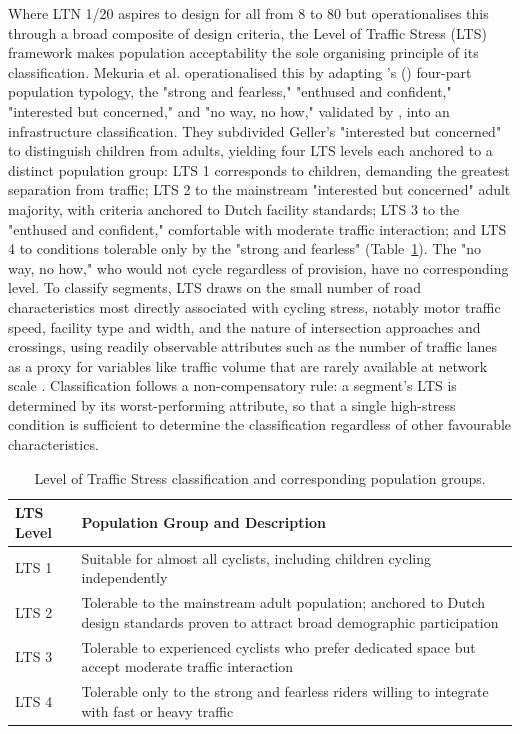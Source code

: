 Where LTN 1/20 aspires to design for all from 8 to 80 but operationalises this through a broad composite of design criteria, the Level of Traffic Stress (LTS) framework \parencite{mekuria2012a} makes population acceptability the sole organising principle of its classification. Mekuria et al. operationalised this by adapting \citeauthor{geller2009}'s (\hyperlink{cite.geller2009}{\citeyear{geller2009}}) four-part population typology, the "strong and fearless," "enthused and confident," "interested but concerned," and "no way, no how," validated by \textcite{dill2013}, into an infrastructure classification. They subdivided Geller's "interested but concerned" to distinguish children from adults, yielding four LTS levels each anchored to a distinct population group: LTS 1 corresponds to children, demanding the greatest separation from traffic; LTS 2 to the mainstream "interested but concerned" adult majority, with criteria anchored to Dutch facility standards; LTS 3 to the "enthused and confident," comfortable with moderate traffic interaction; and LTS 4 to conditions tolerable only by the "strong and fearless" (Table~\ref{tab:lts-levels}). The "no way, no how," who would not cycle regardless of provision, have no corresponding level. To classify segments, LTS draws on the small number of road characteristics most directly associated with cycling stress, notably motor traffic speed, facility type and width, and the nature of intersection approaches and crossings, using readily observable attributes such as the number of traffic lanes as a proxy for variables like traffic volume that are rarely available at network scale \parencite{mekuria2012a,furth2016,furth2018,bearn2018}. Classification follows a non-compensatory rule: a segment's LTS is determined by its worst-performing attribute, so that a single high-stress condition is sufficient to determine the classification regardless of other favourable characteristics.

\begin{table}[htbp]
  \centering
  \caption{Level of Traffic Stress classification and corresponding population groups.}
  \label{tab:lts-levels}
  \begin{tabularx}{\textwidth}{l X}
    \toprule
    \textbf{LTS Level} & \textbf{Population Group and Description} \\
    \midrule
    LTS 1 & Suitable for almost all cyclists, including children cycling independently \\
    LTS 2 & Tolerable to the mainstream adult population; anchored to Dutch design standards proven to attract broad demographic participation \\
    LTS 3 & Tolerable to experienced cyclists who prefer dedicated space but accept moderate traffic interaction \\
    LTS 4 & Tolerable only to the strong and fearless riders willing to integrate with fast or heavy traffic \\
    \bottomrule
  \end{tabularx}
\end{table}


